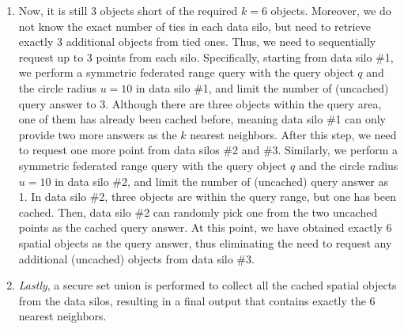 \begin{example}
\begin{enumerate}[(1)]
    \item Now, it is still 3 objects short of the required $k = 6$ objects.
    Moreover, we do not know the exact number of ties in each data silo, but need to retrieve exactly 3 additional objects from tied ones.
    Thus, we need to sequentially request up to 3 points from each silo. 
    Specifically, starting from data silo \#1, we perform a symmetric federated range query with the query object $q$ and the circle radius $u = 10$ in data silo \#1, and limit the number of (uncached) query answer to 3.
    Although there are three objects within the query area, one of them has already been cached before, meaning data silo \#1 can only provide two more answers as the $k$ nearest neighbors.
    After this step, we need to request one more point from data silos \#2 and \#3.
    Similarly, we perform a symmetric federated range query with the query object $q$ and the circle radius $u = 10$ in data silo \#2, and limit the number of (uncached) query answer as 1.
    In data silo \#2, three objects are within the query range, but one has been cached. 
    Then, data silo \#2 can randomly pick one from the two uncached points as the cached query answer. 
    At this point, we have obtained exactly $6$ spatial objects as the query answer, thus eliminating the need to request any additional (uncached) objects from data silo \#3.
    
    \item \textit{Lastly}, a secure set union is performed to collect all the cached spatial objects from the data silos, resulting in a final output that contains exactly the 6 nearest neighbors.
    \end{enumerate}
\end{example}


